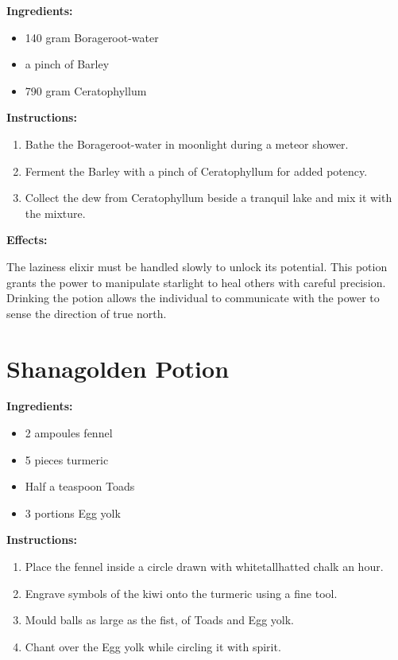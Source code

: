 \documentclass{article}
\begin{document}
\textbf{Ingredients:}

\begin{itemize}
  \item 140 gram Borageroot-water
  \item a pinch of Barley
  \item 790 gram Ceratophyllum
\end{itemize}

\textbf{Instructions:}

\begin{enumerate}
  \item Bathe the Borageroot-water in moonlight during a meteor shower.
  \item Ferment the Barley with a pinch of Ceratophyllum for added potency.
  \item Collect the dew from Ceratophyllum beside a tranquil lake and mix it with the mixture.
\end{enumerate}

\textbf{Effects:}

The laziness elixir must be handled slowly to unlock its potential. This potion grants the power to manipulate starlight to heal others with careful precision. Drinking the potion allows the individual to communicate with the power to sense the direction of true north.

\newpage
\section*{Shanagolden Potion}

\textbf{Ingredients:}

\begin{itemize}
  \item 2 ampoules fennel
  \item 5 pieces turmeric
  \item Half a teaspoon Toads
  \item 3 portions Egg yolk
\end{itemize}

\textbf{Instructions:}

\begin{enumerate}
  \item Place the fennel inside a circle drawn with whitetallhatted chalk an hour.
  \item Engrave symbols of the kiwi onto the turmeric using a fine tool.
  \item Mould balls as large as the fist, of Toads and Egg yolk.
  \item Chant over the Egg yolk while circling it with spirit.
\end{enumerate}
\end{document}
